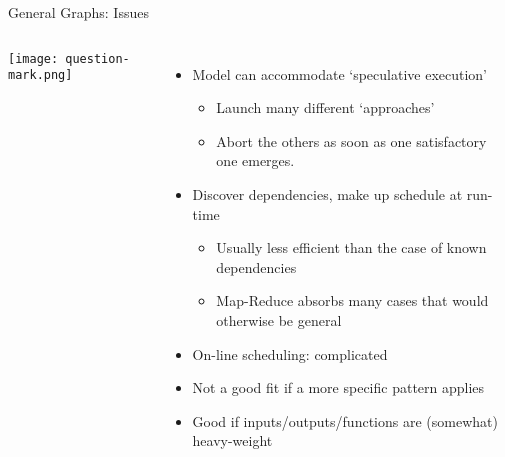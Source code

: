 \documentclass[english,compress]{beamer}
\begin{document}
\begin{frame}{General Graphs: Issues}
  \begin{columns}
      \texttt{[image: question-mark.png]}
      \begin{itemize}
        \item Model can accommodate `speculative execution'
          \begin{itemize}
            \item Launch many different `approaches'
            \item Abort the others as soon as one satisfactory one
            emerges.
          \end{itemize}

        \item Discover dependencies, make up schedule at run-time%
          \begin{itemize}
            \item Usually less efficient than the case of known
            dependencies
            \item Map-Reduce absorbs many cases that would otherwise
            be general
          \end{itemize}
        \item On-line scheduling: complicated
        \item Not a good fit if a more specific pattern applies
        \item Good if inputs/outputs/functions are (somewhat) heavy-weight
      \end{itemize}
  \end{columns}
\end{frame}

\questionframe{}
\imagecreditslide
\end{document}
